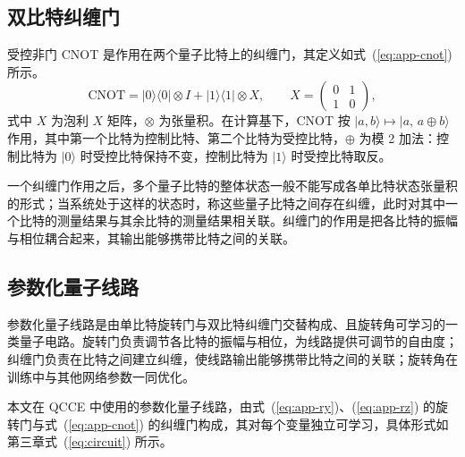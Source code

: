 \subsection{双比特纠缠门}

受控非门 CNOT 是作用在两个量子比特上的纠缠门，其定义如式~(\ref{eq:app-cnot}) 所示。
\begin{equation}
\label{eq:app-cnot}
\mathrm{CNOT} = |0\rangle\langle 0|\otimes I + |1\rangle\langle 1|\otimes X,\qquad X=\begin{pmatrix}0&1\\1&0\end{pmatrix},
\end{equation}
式中 $X$ 为泡利 $X$ 矩阵，$\otimes$ 为张量积。在计算基下，CNOT 按 $|a,b\rangle\mapsto|a,\,a\oplus b\rangle$ 作用，其中第一个比特为控制比特、第二个比特为受控比特，$\oplus$ 为模 2 加法：控制比特为 $|0\rangle$ 时受控比特保持不变，控制比特为 $|1\rangle$ 时受控比特取反。

一个纠缠门作用之后，多个量子比特的整体状态一般不能写成各单比特状态张量积的形式；当系统处于这样的状态时，称这些量子比特之间存在纠缠，此时对其中一个比特的测量结果与其余比特的测量结果相关联。纠缠门的作用是把各比特的振幅与相位耦合起来，其输出能够携带比特之间的关联。

\subsection{参数化量子线路}

参数化量子线路是由单比特旋转门与双比特纠缠门交替构成、且旋转角可学习的一类量子电路。旋转门负责调节各比特的振幅与相位，为线路提供可调节的自由度；纠缠门负责在比特之间建立纠缠，使线路输出能够携带比特之间的关联；旋转角在训练中与其他网络参数一同优化。

本文在 QCCE 中使用的参数化量子线路，由式~(\ref{eq:app-ry})、(\ref{eq:app-rz}) 的旋转门与式~(\ref{eq:app-cnot}) 的纠缠门构成，其对每个变量独立可学习，具体形式如第三章式~(\ref{eq:circuit}) 所示。
